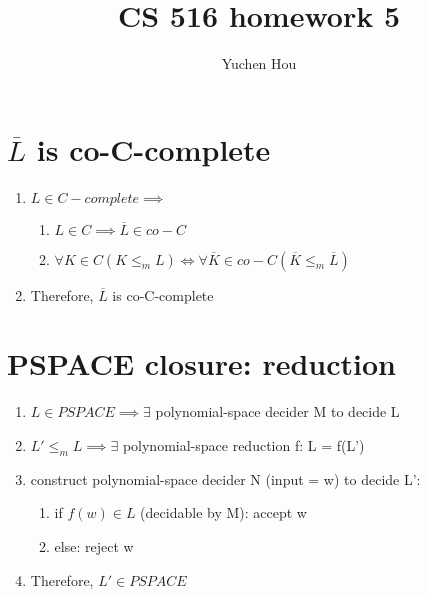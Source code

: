 \documentclass{article}
\begin{document}
\lstset{language=python, tabsize=4}
\title{CS 516 homework 5}
\author{Yuchen Hou}
\maketitle

\section{$ \overline{L} $ is co-C-complete}
\begin{enumerate}
	\item $ L \in C-complete \implies $
	\begin{enumerate}
		\item $ L \in C \implies \overline{L} \in co-C $
		\item $ \forall K \in C (K \leq_m L) \iff 
		\forall \overline{K} \in co-C (\overline{K} \leq_m \overline{L}) $
	\end{enumerate}
	\item Therefore, $ \overline{L} $ is co-C-complete
\end{enumerate}

\section{PSPACE closure: reduction}
\begin{enumerate}
	\item $ L \in PSPACE \implies \exists $ polynomial-space decider M to 
	decide L
	\item $ L' \leq_m L \implies \exists $ polynomial-space reduction f: L = 
	f(L')
	\item construct polynomial-space decider N (input = w) to decide L':
	\begin{enumerate}
		\item if $ f(w) \in L $ (decidable by M): accept w
		\item else: reject w
	\end{enumerate}
	\item Therefore, $ L' \in PSPACE $
\end{enumerate}
\end{document}
